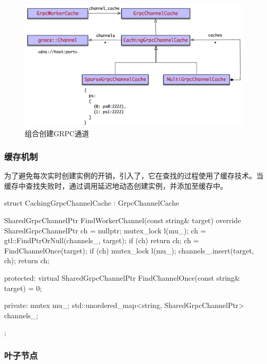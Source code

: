 \begin{content}
\begin{figure}[H]
\centering
\includegraphics[width=1.0\textwidth]{figures/dist-grpc-channel-cache.png}
\caption{组合创建GRPC通道}
 \label{fig:dist-grpc-channel-cache}
\end{figure}

\subsubsection{缓存机制}

为了避免每次实时创建实例的开销，引入了，它在查找的过程使用了缓存技术。当缓存中查找失败时，通过调用延迟地动态创建实例，并添加至缓存中。

\begin{leftbar}
\begin{c++}
struct CachingGrpcChannelCache : GrpcChannelCache {
  SharedGrpcChannelPtr FindWorkerChannel(const string& target) override {
    SharedGrpcChannelPtr ch = nullptr;
    {
      mutex_lock l(mu_);
      ch = gtl::FindPtrOrNull(channels_, target);
      if (ch) {
        return ch;
      }
    }
    ch = FindChannelOnce(target);
    if (ch) {
      mutex_lock l(mu_);
      channels_.insert({target, ch});
    }
    return ch;
  }

 protected:
  virtual SharedGrpcChannelPtr FindChannelOnce(const string& target) = 0;

 private:
  mutex mu_;
  std::unordered_map<string, SharedGrpcChannelPtr> channels_;
};
\end{c++}
\end{leftbar}

\subsubsection{叶子节点}


\end{content}
